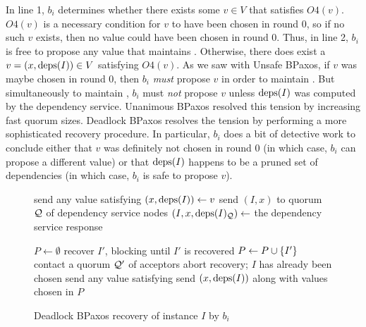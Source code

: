 In line 1, $b_i$ determines whether there exists some $v \in V$ that satisfies
$O4(v)$. $O4(v)$ is a necessary condition for $v$ to have been chosen in round
$0$, so if no such $v$ exists, then no value could have been chosen in round
$0$. Thus, in line 2, $b_i$ is free to propose any value that maintains
.
%
Otherwise, there does exist a $v = (x, \text{deps}(I)) \in V$ satisfying $O4(v)$. As
we saw with Unsafe BPaxos, if $v$ was maybe chosen in round $0$, then $b_i$
\emph{must} propose $v$ in order to maintain . But
simultaneously to maintain , $b_i$ must \emph{not}
propose $v$ unless $\text{deps}(I)$ was computed by the dependency service. Unanimous
BPaxos resolved this tension by increasing fast quorum sizes. Deadlock BPaxos
resolves the tension by performing a more sophisticated recovery procedure.  In
particular, $b_i$ does a bit of detective work to conclude either that $v$ was
definitely not chosen in round $0$ (in which case, $b_i$ can propose a
different value) or that $\text{deps}(I)$ happens to be a pruned set of dependencies
(in which case, $b_i$ is safe to propose $v$).

\begin{wrapfigure}{r}{3.6in}
  \begin{minipage}{3.6in}
    \begin{algorithm}[H]
      \caption{Deadlock BPaxos recovery of instance $I$ by $b_i$}%
      \begin{algorithmic}[1]
          \State send any value satisfying 
        \Else{}
          \State $(x, \text{deps}(I)) \gets v$
        \EndIf{}
        \State send $(I, x)$ to quorum $\mathcal{Q}$ of dependency service nodes
        \State $(I, x, \text{deps}(I)_{\mathcal{Q}}) \gets$ the dependency service response

        \State
        \State $P \gets \emptyset$
            \State recover $I'$, blocking until $I'$ is recovered
          \EndIf
            \State $P \gets P \cup \{I'\}$
          \Else{}
            \State contact a quorum $\mathcal{Q}'$ of acceptors
              \State abort recovery; $I$ has already been chosen
            \Else{}
              \State send any value satisfying 
            \EndIf{}
          \EndIf{}
        \EndFor{}
        \State send $(x, \text{deps}(I))$ along with values chosen in $P$
      \end{algorithmic}
    \end{algorithm}
  \end{minipage}
\end{wrapfigure}

